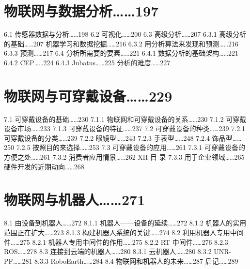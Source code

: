 \documentclass[12pt,UTF8]{ctexbook}
\begin{document}
\chapter{物联网与数据分析……197}
6.1
传感器数据与分析……198
6.2
可视化……200
6.3
高级分析……207
6.3.1
高级分析的基础……207
机器学习和数据挖掘……216
6.3.2
用分析算法来发现和预测……216
6.3.3
预测……217
6.4
分析所需要的要素……221
6.4.1
数据分析的基础架构……221
6.4.2
CEP……224
6.4.3
Jubatus……225
分析的难度……227

\chapter{物联网与可穿戴设备……229}
7.1
可穿戴设备的基础……230
7.1.1
物联网和可穿戴设备的关系……230
7.1.2
可穿戴设备市场……233
7.1.3
可穿戴设备的特征……237
7.2
可穿戴设备的种类……239
7.2.1
可穿戴设备的分类……239
7.2.2
眼镜型……243
7.2.3
手表型……248
7.2.4
饰品型……250
7.2.5
按照目的来选择……253
7.3
可穿戴设备的应用……261
7.3.1
可穿戴设备的方便之处……261
7.3.2
消费者应用情景……262
XII
目
录
7.3.3
用于企业领域……265
硬件开发的近期动向……268

\chapter{物联网与机器人……271}
8.1
由设备到机器人……272
8.1.1
机器人——设备的延续……272
8.1.2
机器人的实用范围正在扩大……273
8.1.3
构建机器人系统的关键……274
8.2
利用机器人专用中间件……275
8.2.1
机器人专用中间件的作用……275
8.2.2
RT 中间件……276
8.2.3
ROS……278
8.3
连接到云端的机器人……280
8.3.1
云机器人……280
8.3.2
UNR-PF……281
8.3.3
RoboEarth……284
8.4
物联网和机器人的未来……287
后记……289


\backmatter
\end{document}
